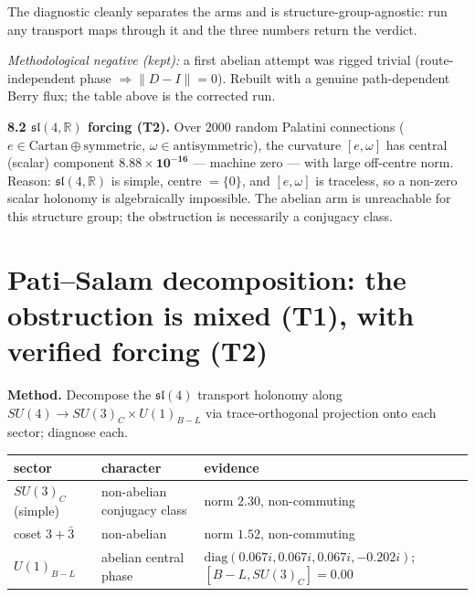 \documentclass[11pt]{article}
\newcommand{\sltwo}{\mathfrak{sl}(4,\mathbb{R})}
\begin{document}
\noindent The diagnostic cleanly separates the arms and is structure-group-agnostic: run any transport maps through it and the three numbers return the verdict.

\emph{Methodological negative (kept):} a first abelian attempt was rigged trivial (route-independent phase $\Rightarrow\|D-I\|=0$). Rebuilt with a genuine path-dependent Berry flux; the table above is the corrected run.

\textbf{8.2 $\sltwo$ forcing (T2).} Over $2000$ random Palatini connections ($e\in\text{Cartan}\oplus\text{symmetric}$, $\omega\in\text{antisymmetric}$), the curvature $[e,\omega]$ has central (scalar) component $\mathbf{8.88\times10^{-16}}$ --- machine zero --- with large off-centre norm. Reason: $\sltwo$ is simple, centre $=\{0\}$, and $[e,\omega]$ is traceless, so a non-zero scalar holonomy is algebraically impossible. The abelian arm is unreachable for this structure group; the obstruction is necessarily a conjugacy class.

\section{Pati--Salam decomposition: the obstruction is mixed (T1), with verified forcing (T2)}

\textbf{Method.} Decompose the $\mathfrak{sl}(4)$ transport holonomy along $SU(4)\to SU(3)_C\times U(1)_{B-L}$ via trace-orthogonal projection onto each sector; diagnose each.

\begin{center}
\begin{tabular}{lll}
\toprule
sector & character & evidence \\
\midrule
$SU(3)_C$ (simple) & non-abelian conjugacy class & norm $2.30$, non-commuting \\
coset $3+\bar3$ & non-abelian & norm $1.52$, non-commuting \\
$U(1)_{B-L}$ & abelian central phase & $\mathrm{diag}(0.067i,0.067i,0.067i,-0.202i)$; $[B{-}L,SU(3)_C]=0.00$ \\
\bottomrule
\end{tabular}
\end{center}
\end{document}
